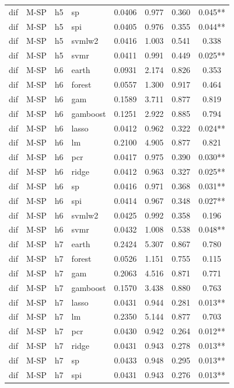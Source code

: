 \begin{ThreePartTable}
\begin{longtable}[t]{llclcccc}
dif & M-SP & h5 & sp & 0.0406 & 0.977 & 0.360 & 0.045**\\
dif & M-SP & h5 & spi & 0.0405 & 0.976 & 0.355 & 0.044**\\
dif & M-SP & h5 & svmlw2 & 0.0416 & 1.003 & 0.541 & 0.338\\
dif & M-SP & h5 & svmr & 0.0411 & 0.991 & 0.449 & 0.025**\\
\addlinespace
dif & M-SP & h6 & earth & 0.0931 & 2.174 & 0.826 & 0.353\\
dif & M-SP & h6 & forest & 0.0557 & 1.300 & 0.917 & 0.464\\
dif & M-SP & h6 & gam & 0.1589 & 3.711 & 0.877 & 0.819\\
dif & M-SP & h6 & gamboost & 0.1251 & 2.922 & 0.885 & 0.794\\
dif & M-SP & h6 & lasso & 0.0412 & 0.962 & 0.322 & 0.024**\\
dif & M-SP & h6 & lm & 0.2100 & 4.905 & 0.877 & 0.821\\
dif & M-SP & h6 & pcr & 0.0417 & 0.975 & 0.390 & 0.030**\\
dif & M-SP & h6 & ridge & 0.0412 & 0.963 & 0.327 & 0.025**\\
dif & M-SP & h6 & sp & 0.0416 & 0.971 & 0.368 & 0.031**\\
dif & M-SP & h6 & spi & 0.0414 & 0.967 & 0.348 & 0.027**\\
dif & M-SP & h6 & svmlw2 & 0.0425 & 0.992 & 0.358 & 0.196\\
dif & M-SP & h6 & svmr & 0.0432 & 1.008 & 0.538 & 0.048**\\
\addlinespace
dif & M-SP & h7 & earth & 0.2424 & 5.307 & 0.867 & 0.780\\
dif & M-SP & h7 & forest & 0.0526 & 1.151 & 0.755 & 0.115\\
dif & M-SP & h7 & gam & 0.2063 & 4.516 & 0.871 & 0.771\\
dif & M-SP & h7 & gamboost & 0.1570 & 3.438 & 0.880 & 0.763\\
dif & M-SP & h7 & lasso & 0.0431 & 0.944 & 0.281 & 0.013**\\
dif & M-SP & h7 & lm & 0.2350 & 5.144 & 0.877 & 0.703\\
dif & M-SP & h7 & pcr & 0.0430 & 0.942 & 0.264 & 0.012**\\
dif & M-SP & h7 & ridge & 0.0431 & 0.943 & 0.278 & 0.013**\\
dif & M-SP & h7 & sp & 0.0433 & 0.948 & 0.295 & 0.013**\\
dif & M-SP & h7 & spi & 0.0431 & 0.943 & 0.276 & 0.013**\\

\end{longtable}
\end{ThreePartTable}
